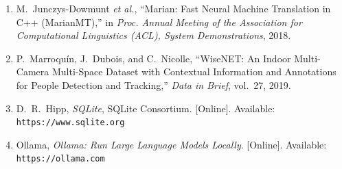 \documentclass[12pt]{report}
\begin{document}
\begin{enumerate}
    \item M.~Junczys-Dowmunt \textit{et al.}, ``Marian: Fast Neural Machine Translation in C++ (MarianMT),'' in \textit{Proc. Annual Meeting of the Association for Computational Linguistics (ACL), System Demonstrations}, 2018.

    \item P.~Marroqu\'in, J.~Dubois, and C.~Nicolle, ``WiseNET: An Indoor Multi-Camera Multi-Space Dataset with Contextual Information and Annotations for People Detection and Tracking,'' \textit{Data in Brief}, vol.~27, 2019.

    \item D.~R.~Hipp, \textit{SQLite}, SQLite Consortium. [Online]. Available: \texttt{https://www.sqlite.org}

    \item Ollama, \textit{Ollama: Run Large Language Models Locally}. [Online]. Available: \texttt{https://ollama.com}

\end{enumerate}
\end{document}
